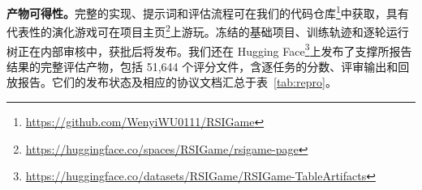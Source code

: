 \documentclass[10pt]{article}
\begin{document}
\textbf{产物可得性。}完整的实现、提示词和评估流程可在我们的代码仓库\footnote{\url{https://github.com/WenyiWU0111/RSIGame}}中获取，具有代表性的演化游戏可在项目主页\footnote{\url{https://huggingface.co/spaces/RSIGame/rsigame-page}}上游玩。冻结的基础项目、训练轨迹和逐轮运行树正在内部审核中，获批后将发布。我们还在 Hugging Face\footnote{\url{https://huggingface.co/datasets/RSIGame/RSIGame-TableArtifacts}}上发布了支撑所报告结果的完整评估产物，包括 51,644 个评分文件，含逐任务的分数、评审输出和回放报告。它们的发布状态及相应的协议文档汇总于表~\ref{tab:repro}。

\clearpage

\clearpage



\end{document}
